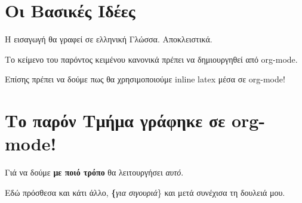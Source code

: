 \section{Οι Βασικές Ιδέες}
Η εισαγωγή θα γραφεί σε ελληνική Γλώσσα. Αποκλειστικά.

Το κείμενο του παρόντος κειμένου κανονικά πρέπει να δημιουργηθεί από org-mode.

Επίσης πρέπει να δούμε πως θα χρησιμοποιούμε inline latex μέσα σε org-mode!

\section{Το παρόν Τμήμα γράφηκε σε org-mode!}

Γιά να δούμε \textbf{με ποιό τρόπο} θα λειτουργήσει \textit{αυτό}.

Εδώ πρόσθεσα και κάτι άλλο, \textbf\{\textit{για σιγουριά}\} και μετά συνέχισα τη δουλειά μου.
